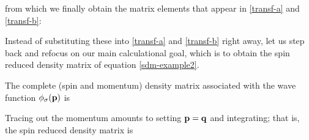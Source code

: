 \documentclass[12pt,a4paper,notitlepage]{report}
\begin{document}
%
from which we finally obtain the matrix elements that appear in \eqref{transf-a} and \eqref{transf-b}:

%
Instead of substituting these into \eqref{transf-a} and \eqref{transf-b} right away, let us step back and refocus on our main calculational goal, which is to obtain the spin reduced density matrix of equation \eqref{sdm-example2}.

The complete (spin and momentum) density matrix associated with the wave function $\phi_{\sigma}(\vb{p})$ is

%
Tracing out the momentum amounts to setting $\vb{p} = \vb{q}$ and integrating; that is, the spin reduced density matrix is
\end{document}
